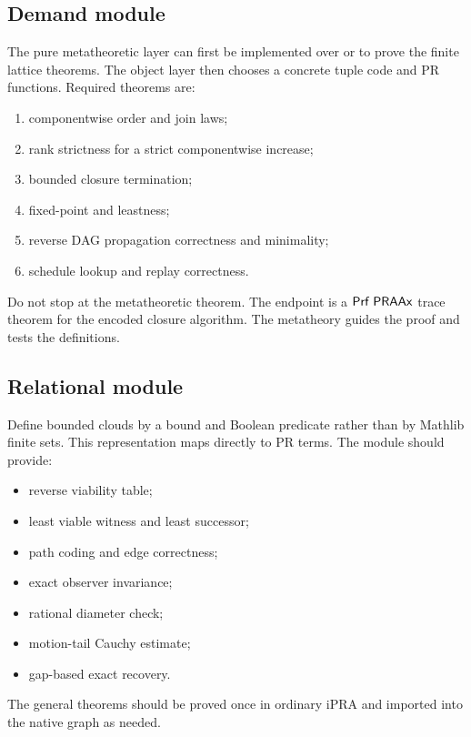 \subsection{Demand module}

The pure metatheoretic layer can first be implemented over
 or  to prove the finite lattice theorems.
The object layer then chooses a concrete tuple code and PR functions.  Required
theorems are:

\begin{enumerate}
\item componentwise order and join laws;
\item rank strictness for a strict componentwise increase;
\item bounded closure termination;
\item fixed-point and leastness;
\item reverse DAG propagation correctness and minimality;
\item schedule lookup and replay correctness.
\end{enumerate}

Do not stop at the metatheoretic theorem.  The endpoint is a
\(\mathsf{Prf}\;\mathsf{PRAAx}\) trace theorem for the encoded closure algorithm.  The
metatheory guides the proof and tests the definitions.

\subsection{Relational module}

Define bounded clouds by a bound and Boolean predicate rather than by Mathlib
finite sets.  This representation maps directly to PR terms.  The module should
provide:

\begin{itemize}
\item reverse viability table;
\item least viable witness and least successor;
\item path coding and edge correctness;
\item exact observer invariance;
\item rational diameter check;
\item motion-tail Cauchy estimate;
\item gap-based exact recovery.
\end{itemize}

The general theorems should be proved once in ordinary iPRA and imported into
the native graph as needed.

